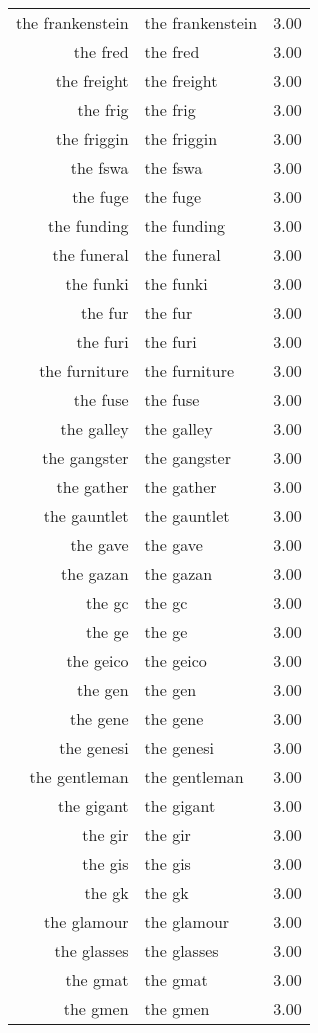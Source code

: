 \begin{table}[ht]
\begin{tabular}{rlr}
  the frankenstein & the frankenstein & 3.00 \\ 
  the fred & the fred & 3.00 \\ 
  the freight & the freight & 3.00 \\ 
  the frig & the frig & 3.00 \\ 
  the friggin & the friggin & 3.00 \\ 
  the fswa & the fswa & 3.00 \\ 
  the fuge & the fuge & 3.00 \\ 
  the funding & the funding & 3.00 \\ 
  the funeral & the funeral & 3.00 \\ 
  the funki & the funki & 3.00 \\ 
  the fur & the fur & 3.00 \\ 
  the furi & the furi & 3.00 \\ 
  the furniture & the furniture & 3.00 \\ 
  the fuse & the fuse & 3.00 \\ 
  the galley & the galley & 3.00 \\ 
  the gangster & the gangster & 3.00 \\ 
  the gather & the gather & 3.00 \\ 
  the gauntlet & the gauntlet & 3.00 \\ 
  the gave & the gave & 3.00 \\ 
  the gazan & the gazan & 3.00 \\ 
  the gc & the gc & 3.00 \\ 
  the ge & the ge & 3.00 \\ 
  the geico & the geico & 3.00 \\ 
  the gen & the gen & 3.00 \\ 
  the gene & the gene & 3.00 \\ 
  the genesi & the genesi & 3.00 \\ 
  the gentleman & the gentleman & 3.00 \\ 
  the gigant & the gigant & 3.00 \\ 
  the gir & the gir & 3.00 \\ 
  the gis & the gis & 3.00 \\ 
  the gk & the gk & 3.00 \\ 
  the glamour & the glamour & 3.00 \\ 
  the glasses & the glasses & 3.00 \\ 
  the gmat & the gmat & 3.00 \\ 
  the gmen & the gmen & 3.00 \\ 

\end{tabular}
\end{table}
